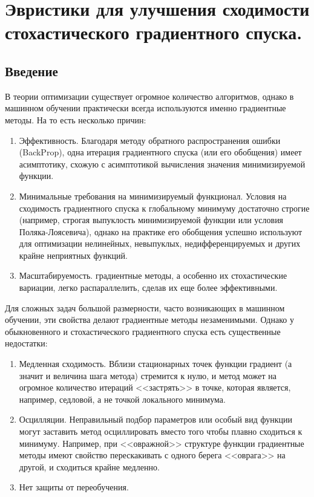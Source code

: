 \section{Эвристики для улучшения сходимости стохастического градиентного спуска.}

\subsection{Введение}
В теории оптимизации существует огромное количество алгоритмов, однако в машинном обучении практически всегда используются именно градиентные методы. На то есть несколько причин:

\begin{enumerate}
	\item Эффективность. Благодаря методу обратного распространения ошибки (BackProp), одна итерация градиентного спуска (или его обобщения) имеет асимптотику, схожую с асимптотикой вычисления значения минимизируемой функции.
	\item Минимальные требования на минимизируемый функционал. Условия на сходимость градиентного спуска к глобальному минимуму достаточно строгие (например, строгая выпуклость минимизируемой функции или условия Поляка-Лоясевича), однако на практике его обобщения успешно используют для оптимизации нелинейных, невыпуклых, недифференцируемых и других крайне неприятных функций.
	\item Масштабируемость. градиентные методы, а особенно их стохастические вариации, легко распараллелить, сделав их еще более эффективными.
\end{enumerate}

Для сложных задач большой размерности, часто возникающих в машинном обучении, эти свойства делают градиентные методы незаменимыми. Однако у обыкновенного и стохастического градиентного спуска есть существенные недостатки:

\begin{enumerate}
	\item Медленная сходимость. Вблизи стационарных точек функции градиент (а значит и величина шага метода) стремится к нулю, и метод может на огромное количество итераций <<застрять>> в точке, которая является, например, седловой, а не точкой локального минимума.
	\item Осцилляции. Неправильный подбор параметров или особый вид функции могут заставить метод осциллировать вместо того чтобы плавно сходиться к минимуму. Например, при <<овражной>> структуре функции градиентные методы имеют свойство перескакивать с одного берега <<оврага>> на другой, и сходиться крайне медленно.
	\item Нет защиты от переобучения.
\end{enumerate}

